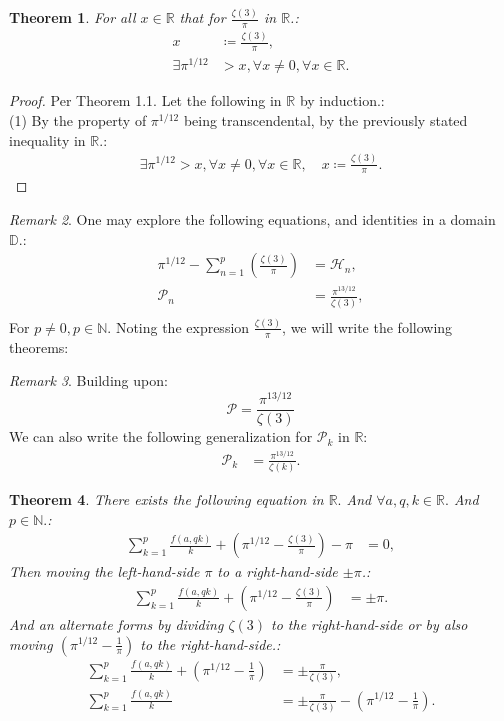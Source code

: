 \documentclass[10pt]{article}
\theoremstyle{plain}
\newtheorem{theorem}{Theorem}[section]
\theoremstyle{definition}
\theoremstyle{remark}
\newtheorem{remark}[theorem]{Remark}
\begin{document}
\begin{theorem}
For all $x \in \mathbb{R}$ that for $\frac{\zeta(3)}{\pi}$ in $\mathbb{R}$.:
\begin{align*}
	x &\coloneq \frac{\zeta(3)}{\pi},\\
	\exists \pi^{1/12} &> x, \forall x \neq 0, \forall x \in \mathbb{R}.
\end{align*}
\end{theorem}
\begin{proof}
Per Theorem 1.1. Let the following in $\mathbb{R}$ by induction.:\\(1) By the property of $\pi^{1/12}$ being transcendental, by the previously stated inequality in $\mathbb{R}.$:
\begin{align*}
		\exists \pi^{1/12} > x, \forall x \neq 0, \forall x \in \mathbb{R}, \quad x \coloneq \frac{\zeta(3)}{\pi}.
\end{align*}
\end{proof}
\begin{remark}
	One may explore the following equations, and identities in a domain $\mathbb{D}.$:
	\begin{align*}
		\pi^{1/12} - \sum_{n=1}^{p}(\frac{\zeta(3)}{\pi}) &= \mathcal{H}_n,\\
		\mathcal{P}_n &= \frac{\pi^{13/12}}{\zeta(3)},\\
	\end{align*}
	For $p \neq 0, p \in \mathbb{N}$. Noting the expression $\frac{\zeta(3)}{\pi}$, we will write the following theorems:
\end{remark}
\begin{remark}
	Building upon:
	\begin{equation}
		\mathcal{P} = \frac{\pi^{13/12}}{\zeta(3)}
	\end{equation}
	We can also write the following generalization for $\mathcal{P}_k$ in $\mathbb{R}$:
	\begin{align*}
		\mathcal{P}_k &= \frac{\pi^{13/12}}{\zeta(k)}.
	\end{align*}
\end{remark}
\begin{theorem}
There exists the following equation in $\mathbb{R}.$ And $\forall a, q, k \in \mathbb{R}.$ And $p \in \mathbb{N}.$:
\begin{align*}
	\sum_{k=1}^{p} \frac{f(a, qk)}{k} + (\pi^{1/12} - \frac{\zeta(3)}{\pi}) - \pi &= 0,
\end{align*}
Then moving the left-hand-side $\pi$ to a right-hand-side $\pm \pi$.:
\begin{align*}
	\sum_{k=1}^{p} \frac{f(a, qk)}{k} + (\pi^{1/12} - \frac{\zeta(3)}{\pi}) &= \pm \pi.
\end{align*}
And an alternate forms by dividing $\zeta(3)$ to the right-hand-side or by also moving $(\pi^{1/12} - \frac{1}{\pi})$ to the right-hand-side.:
\begin{align*}
	\sum_{k=1}^{p} \frac{f(a, qk)}{k} + (\pi^{1/12} - \frac{1}{\pi}) &= \pm \frac{\pi}{\zeta(3)},\\
	\sum_{k=1}^{p} \frac{f(a, qk)}{k} &= \pm \frac{\pi}{\zeta(3)} - (\pi^{1/12} - \frac{1}{\pi}) .
\end{align*}
\end{theorem}
\end{document}
